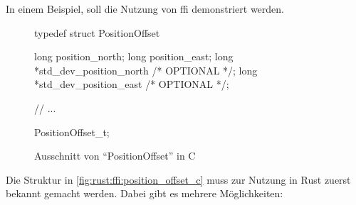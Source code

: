 In einem Beispiel, soll die Nutzung von \gls{ffi} demonstriert werden.

\begin{figure}[H]
	\begin{cc}
		typedef struct PositionOffset {
			long position_north;
			long position_east;
			long *std_dev_position_north /* OPTIONAL */;
			long *std_dev_position_east  /* OPTIONAL */;
			
			// ...
		} PositionOffset_t;
	\end{cc}
	\caption{Ausschnitt von \enquote{PositionOffset}  in C}
	\label{fig:rust:ffi:position_offset_c}
\end{figure}

Die Struktur in \autoref{fig:rust:ffi:position_offset_c} muss zur Nutzung in Rust zuerst bekannt gemacht werden.
Dabei gibt es mehrere Möglichkeiten:
